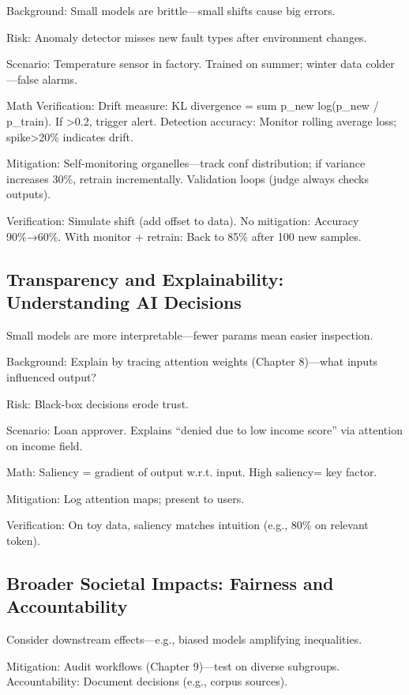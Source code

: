 \documentclass[
]{article}
\begin{document}
Background: Small models are brittle---small shifts cause big errors.

Risk: Anomaly detector misses new fault types after environment changes.

Scenario: Temperature sensor in factory. Trained on summer; winter data
colder---false alarms.

Math Verification: Drift measure: KL divergence = sum p\_new log(p\_new
/ p\_train). If \textgreater0.2, trigger alert. Detection accuracy:
Monitor rolling average loss; spike\textgreater20\% indicates drift.

Mitigation: Self-monitoring organelles---track conf distribution; if
variance increases 30\%, retrain incrementally. Validation loops (judge
always checks outputs).

Verification: Simulate shift (add offset to data). No mitigation:
Accuracy 90\%→60\%. With monitor + retrain: Back to 85\% after 100 new
samples.

\subsection{Transparency and Explainability: Understanding AI
Decisions}\label{transparency-and-explainability-understanding-ai-decisions}

Small models are more interpretable---fewer params mean easier
inspection.

Background: Explain by tracing attention weights (Chapter 8)---what
inputs influenced output?

Risk: Black-box decisions erode trust.

Scenario: Loan approver. Explains ``denied due to low income score'' via
attention on income field.

Math: Saliency = gradient of output w.r.t. input. High saliency= key
factor.

Mitigation: Log attention maps; present to users.

Verification: On toy data, saliency matches intuition (e.g., 80\% on
relevant token).

\subsection{Broader Societal Impacts: Fairness and
Accountability}\label{broader-societal-impacts-fairness-and-accountability}

Consider downstream effects---e.g., biased models amplifying
inequalities.

Mitigation: Audit workflows (Chapter 9)---test on diverse subgroups.
Accountability: Document decisions (e.g., corpus sources).
\end{document}
